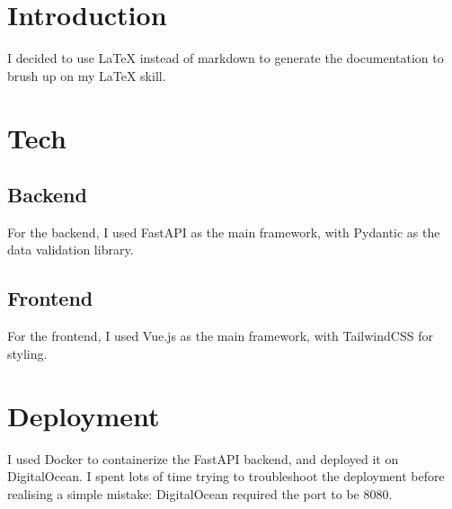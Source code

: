 \documentclass{article}
\begin{document}
\section{Introduction}
I decided to use LaTeX instead of markdown to generate the documentation to brush up on my LaTeX skill.

\section{Tech}
\subsection{Backend}
For the backend, I used FastAPI as the main framework, with Pydantic as the data validation library.

\subsection{Frontend}
For the frontend, I used Vue.js as the main framework, with TailwindCSS for styling.

\section{Deployment}
I used Docker to containerize the FastAPI backend, and deployed it on DigitalOcean. I spent lots of time trying to troubleshoot the deployment before realising a simple mistake: DigitalOcean required the port to be 8080.
\end{document}
